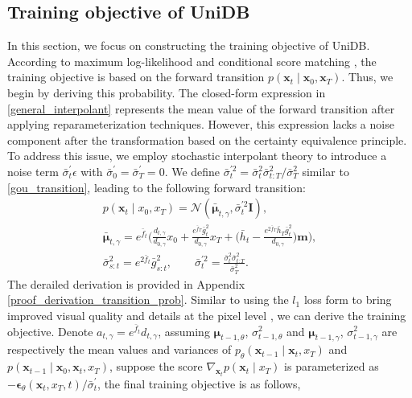 \subsection{Training objective of UniDB}
In this section, we focus on constructing the training objective of UniDB. According to maximum log-likelihood \cite{ho2020denoisingdiffusionprobabilisticmodels} and conditional score matching \cite{song2021scorebasedgenerativemodelingstochastic}, the training objective is based on the forward transition $p(\mathbf{x}_t\mid\mathbf{x}_0,\mathbf{x}_T)$. Thus, we begin by deriving this probability. The closed-form expression in \eqref{general_interpolant} represents the mean value of the forward transition after applying reparameterization techniques. However, this expression lacks a noise component after the transformation based on the certainty equivalence principle. To address this issue, we employ stochastic interpolant theory \cite{albergo2023stochasticinterpolantsunifyingframework} to introduce a noise term $\bar{\sigma}_t^{\prime}\epsilon$ with $\bar{\sigma}_0^{\prime} = \bar{\sigma}_T^{\prime} = 0$. We define $\bar{\sigma}_t^{\prime2} = \bar{\sigma}_t^2\bar{\sigma}_{t:T}^2 / \bar{\sigma}_T^2$ similar to \eqref{gou_transition}, leading to the following forward transition: 
\begin{equation}\label{mu_gamma_prime}
\begin{gathered}
p(\mathbf{x}_t\mid x_0, x_T)=\mathcal{N}(\bar{\boldsymbol{\mu}}_{t, \gamma},\bar{\sigma}_t^{\prime2}\mathbf{I}), \\
\bar{\boldsymbol{\mu}}_{t, \gamma} = e^{\bar{f}_{t}} \Big(\frac{d_{t, \gamma}}{d_{0, \gamma}} x_0 + \frac{e^{\bar{f}_{T}} \bar{g}^2_{t}}{d_{0, \gamma}} x_T + \big(\bar{h}_{t} - \frac{e^{2\bar{f}_{T}} \bar{h}_{T} \bar{g}^2_{t}}{d_{0, \gamma}}\big) \mathbf{m}\Big), \\
\bar{\sigma}_{s:t}^2 = e^{2\bar{f}_t} \bar{g}^2_{s:t}, \quad \quad \bar{\sigma}_t^{\prime2}=\frac{\bar{\sigma}_t^2\bar{\sigma}_{t:T}^2}{\bar{\sigma}_T^2}.
\end{gathered}
\end{equation}
The derailed derivation is provided in Appendix \ref{proof_derivation_transition_prob}. 
Similar to \cite{yue2024imagerestorationgeneralizedornsteinuhlenbeck} using the $l_1$ loss form to bring improved visual quality and details at the pixel level \cite{boyd2004convex, hastie2009elements}, we can derive the training objective. Denote $a_{t, \gamma} = e^{\bar{f}_{t}}d_{t, \gamma}$, assuming $\boldsymbol{\mu}_{t-1, \theta}$, $\sigma_{t-1, \theta}^2$ and $\boldsymbol{\mu}_{t-1, \gamma}$, $\sigma_{t-1, \gamma}^2$ are respectively the mean values and variances of $p_{\theta} (\mathbf{x}_{t-1} \mid \mathbf{x}_t, x_T)$ and $p (\mathbf{x}_{t-1} \mid \mathbf{x}_0, \mathbf{x}_t, x_T)$, suppose the score $\nabla_{\mathbf{x}_t} p(\mathbf{x}_t \mid x_T)$ is parameterized as $-\boldsymbol{\epsilon}_{\theta}(\mathbf{x}_t, x_T, t) / \bar{\sigma}_{t}^{\prime}$, the final training objective is as follows, 
